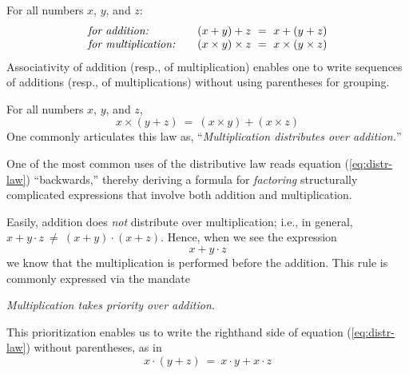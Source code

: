 \medskip

 

For all numbers $x$, $y$, and $z$:
\[
\begin{array}{llc}
\mbox{\it for addition:}
  & &
(x+y)+z \ = \ x+(y+z) \\
\mbox{\it for multiplication:}
  & & 
(x \times y) \times z \ = \ x \times (y \times z)
\end{array}
\] 
Associativity of addition (resp., of multiplication) enables one to write sequences of additions (resp., of multiplications) without using parentheses for grouping.

\medskip

 

For all numbers $x$, $y$, and $z$,
\begin{equation}
\label{eq:distr-law}
x \times (y + z) \ = \ (x \times y) + (x \times z)
\end{equation}
One commonly articulates this law as, ``{\em Multiplication distributes over addition.}''

\smallskip


One of the most common uses of the distributive law reads equation (\ref{eq:distr-law}) ``backwards,'' thereby deriving a formula for {\em factoring} structurally complicated expressions that involve both addition and multiplication.

\smallskip

Easily, addition does {\em not} distribute over multiplication; i.e., in general, $x + y \cdot z \ \neq \ (x+y) \cdot (x+z)$.  Hence, when we see the expression
\[ x + y \cdot z \]
we know that the multiplication is performed before the addition.  This rule is commonly expressed via the mandate

\smallskip

{\em Multiplication takes priority over addition.}

\smallskip

\noindent This prioritization enables us to write the righthand side of equation (\ref{eq:distr-law}) without parentheses, as in
\[ x \cdot (y + z) \ = \ x \cdot y + x \cdot z \]

\medskip

